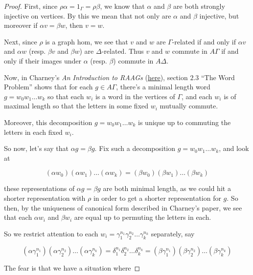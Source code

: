 \documentclass[12pt]{article}
\theoremstyle{definition}
\theoremstyle{theorem}
\begin{document}
\begin{proof}
    First, since $\rho \alpha = 1_\Gamma = \rho \beta$, we know that $\alpha$ and
    $\beta$ are both strongly injective on vertices. By this we mean that not 
    only are $\alpha$ and $\beta$ injective, but moreover if
    $\alpha v = \beta w$, then $v = w$.

    Next, since $\rho$ is a graph
    hom, we see that $v$ and $w$ are $\Gamma$-related if and only if $\alpha v$
    and $\alpha w$ (resp. $\beta v$ and $\beta w$) are $\Delta$-related. Thus 
    $v$ and $w$ commute in $A \Gamma$ if and only if their images under $\alpha$
    (resp. $\beta$) commute in $A \Delta$.

    Now, in Charney's \emph{An Introduction to RAAGs} 
    (\href{https://people.brandeis.edu/~charney/papers/RAAGfinal.pdf}{here}),
    section $2.3$ ``The Word Problem'' shows that for each $g \in A\Gamma$,
    there's a minimal length word $g = w_0 w_1 \ldots w_k$ so that each 
    $w_i$ is a word in the vertices of $\Gamma$, and each $w_i$ is of maximal 
    length so that the letters in some fixed $w_i$ mutually commute.

    Moreover, this decomposition $g = w_0 w_1 \ldots w_k$ is unique up to 
    commuting the letters in each fixed $w_i$.

    So now, let's say that $\alpha g = \beta g$. Fix such a decomposition
    $g = w_0 w_1 \ldots w_k$, and look at 

    \[ (\alpha w_0) (\alpha w_1) \ldots (\alpha w_k) = (\beta w_0) (\beta w_1) \ldots (\beta w_k) \]

    these representations of $\alpha g = \beta g$ are both minimal length, as 
    we could hit a shorter representation with $\rho$ in order to get a 
    shorter representation for $g$. So then, by the uniqueness of canonical form 
    described in Charney's paper, 
    we see that each $\alpha w_i$ and $\beta w_i$ are equal up to permuting the 
    letters in each. 
    
    So we restrict attention to each 
    $w_i = \gamma_1^{n_1} \gamma_2^{n_2} \ldots \gamma_k^{n_k}$ separately, say

    \[ 
    (\alpha \gamma_1^{n_1}) (\alpha \gamma_2^{n_2}) \ldots (\alpha \gamma_k^{n_k}) = 
    \delta_1^{n_1} \delta_2^{n_2} \ldots \delta_k^{n_k} =
    (\beta \gamma_1^{n_1}) (\beta \gamma_2^{n_2}) \ldots (\beta \gamma_k^{n_k})
    \]

    The fear is that we have a situation where 


\end{proof}
\end{document}
